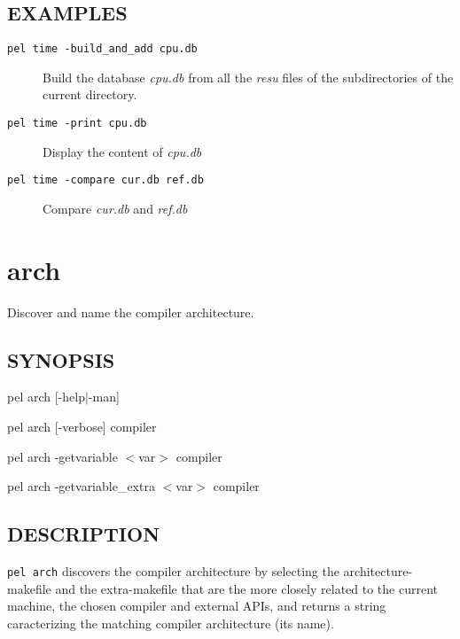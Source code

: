 \documentclass{article}
\begin{document}
\subsection*{EXAMPLES\label{time_EXAMPLES}}
\begin{description}

\item[\texttt{pel time -build\_and\_add cpu.db}] \mbox{}

Build the database \emph{cpu.db} from all the \emph{resu} files of the
subdirectories of the current directory.


\item[\texttt{pel time -print cpu.db}] \mbox{}

Display the content of \emph{cpu.db}


\item[\texttt{pel time -compare cur.db ref.db}] \mbox{}

Compare \emph{cur.db} and \emph{ref.db}

\end{description}
\clearpage
\section{arch\label{arch}}


Discover and name the compiler architecture.

\subsection*{SYNOPSIS\label{arch_SYNOPSIS}}


pel arch [-help$|$-man]



pel arch [-verbose] compiler



pel arch -getvariable $<$var$>$ compiler



pel arch -getvariable\_extra $<$var$>$ compiler

\subsection*{DESCRIPTION\label{arch_DESCRIPTION}}


\texttt{pel arch} discovers the compiler architecture by selecting the
architecture-makefile and the extra-makefile that are the more closely
related to the current machine, the chosen compiler and external APIs, and
returns a string caracterizing the matching compiler architecture (its name).
\end{document}
